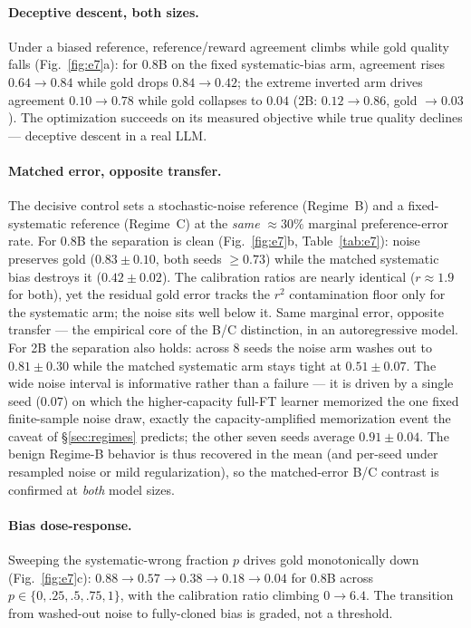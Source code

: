 \documentclass[10pt]{article} %
\theoremstyle{plain}
\theoremstyle{remark}
\begin{document}
\paragraph{Deceptive descent, both sizes.} Under a biased reference, reference/reward agreement climbs while gold quality falls (Fig.~\ref{fig:e7}a): for 0.8B on the fixed systematic-bias arm, agreement rises $0.64\to0.84$ while gold drops $0.84\to0.42$; the extreme inverted arm drives agreement $0.10\to0.78$ while gold collapses to $0.04$ (2B: $0.12\to0.86$, gold $\to0.03$). The optimization succeeds on its measured objective while true quality declines --- deceptive descent in a real LLM.

\paragraph{Matched error, opposite transfer.} The decisive control sets a stochastic-noise reference (Regime~B) and a fixed-systematic reference (Regime~C) at the \emph{same} $\approx\!30\%$ marginal preference-error rate. For 0.8B the separation is clean (Fig.~\ref{fig:e7}b, Table~\ref{tab:e7}): noise preserves gold ($0.83\pm0.10$, both seeds $\ge0.73$) while the matched systematic bias destroys it ($0.42\pm0.02$). The calibration ratios are nearly identical ($r\approx1.9$ for both), yet the residual gold error tracks the $r^2$ contamination floor only for the systematic arm; the noise sits well below it. Same marginal error, opposite transfer --- the empirical core of the B/C distinction, in an autoregressive model. For 2B the separation also holds: across $8$ seeds the noise arm washes out to $0.81\pm0.30$ while the matched systematic arm stays tight at $0.51\pm0.07$. The wide noise interval is informative rather than a failure --- it is driven by a single seed ($0.07$) on which the higher-capacity full-FT learner memorized the one fixed finite-sample noise draw, exactly the capacity-amplified memorization event the caveat of \S\ref{sec:regimes} predicts; the other seven seeds average $0.91\pm0.04$. The benign Regime-B behavior is thus recovered in the mean (and per-seed under resampled noise or mild regularization), so the matched-error B/C contrast is confirmed at \emph{both} model sizes.

\paragraph{Bias dose-response.} Sweeping the systematic-wrong fraction $p$ drives gold monotonically down (Fig.~\ref{fig:e7}c): $0.88\to0.57\to0.38\to0.18\to0.04$ for 0.8B across $p\in\{0,.25,.5,.75,1\}$, with the calibration ratio climbing $0\to6.4$. The transition from washed-out noise to fully-cloned bias is graded, not a threshold.
\end{document}
